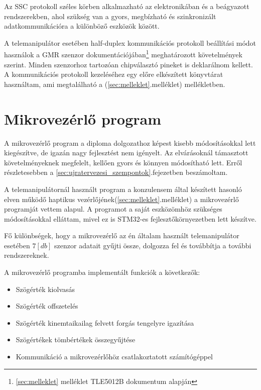 Az SSC protokoll széles körben alkalmazható az elektronikában és a beágyazott rendszerekben, ahol szükség van a gyors, megbízható és szinkronizált adatkommunikációra a különböző eszközök között.

A telemanipulátor esetében half-duplex kommunikációs protokoll beállítási módot használok a GMR szenzor dokumentációjában\footnote{\ref{sec:melleklet} melléklet TLE5012B dokumentum alapján} meghatározott követelmények szerint. Minden szenzorhoz tartozóan chipválasztó pineket is deklarálnom kellett. A kommunikációs protokoll kezeléséhez egy előre elkészített könyvtárat használtam, ami megtalálható a (\ref{sec:melleklet}.melléklet) mellékletben.

\section{Mikrovezérlő program}
\label{sec:MCU_program}

A mikrovezérlő program a diploma dolgozathoz képest kisebb módosításokkal lett kiegészítve, de igazán nagy fejlesztést nem igényelt. Az elvárásoknál támasztott követelményeknek megfelelt, kellően gyors és könnyen módosítható lett. Erről részletesebben a \ref{sec:ujratervezesi_szempontok}.fejezetben beszámoltam.

A telemanipulátornál használt program a konzulensem által készített hasonló elven működő haptikus vezérlőjének(\ref{sec:melleklet}.melléklet) a mikrovezérlő programját vettem alapul. A programot a saját eszközömhöz szükséges módosításokkal elláttam, mivel ez is STM32-es fejlesztőkörnyezetben lett készítve.

Fő különbségek, hogy a mikrovezérlő az én általam használt telemanipulátor esetében $7[db]$ szenzor adatait gyűjti össze, dolgozza fel és továbbítja a további rendszereknek.

A mikrovezérlő programba implementált funkciók a következők:

\begin{itemize}
\item Szögérték kiolvasás
\item Szögérték offszetelés
\item Szögérték kinemtaikailag felvett forgás tengelyre igazítása
\item Szögértékek tömbértékek összegyűjtése
\item Kommunikáció a mikrovezérlőhöz csatlakoztatott számítógéppel
\end{itemize}

